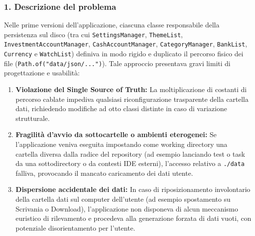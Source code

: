 \documentclass[11pt,a4paper,openright]{report}
\begin{document}
\subsubsection*{1. Descrizione del problema}
Nelle prime versioni dell'applicazione, ciascuna classe responsabile della persistenza sul disco (tra cui \texttt{SettingsManager}, \texttt{ThemeList}, \texttt{InvestmentAccountManager}, \texttt{CashAccountManager}, \texttt{CategoryManager}, \texttt{BankList}, \texttt{Currency} e \texttt{WatchList}) definiva in modo rigido e duplicato il percorso fisico dei file (\texttt{Path.of("data/json/...")}). Tale approccio presentava gravi limiti di progettazione e usabilità:
\begin{enumerate}
  \item \textbf{Violazione del Single Source of Truth:} La moltiplicazione di costanti di percorso cablate impediva qualsiasi riconfigurazione trasparente della cartella dati, richiedendo modifiche ad otto classi distinte in caso di variazione strutturale.
  \item \textbf{Fragilità d'avvio da sottocartelle o ambienti eterogenei:} Se l'applicazione veniva eseguita impostando come working directory una cartella diversa dalla radice del repository (ad esempio lanciando test o task da una sottodirectory o da contesti IDE esterni), l'accesso relativo a \texttt{./data} falliva, provocando il mancato caricamento dei dati utente.
  \item \textbf{Dispersione accidentale dei dati:} In caso di riposizionamento involontario della cartella dati sul computer dell'utente (ad esempio spostamento su Scrivania o Download), l'applicazione non disponeva di alcun meccanismo euristico di rilevamento e procedeva alla generazione forzata di dati vuoti, con potenziale disorientamento per l'utente.
\end{enumerate}
\end{document}
